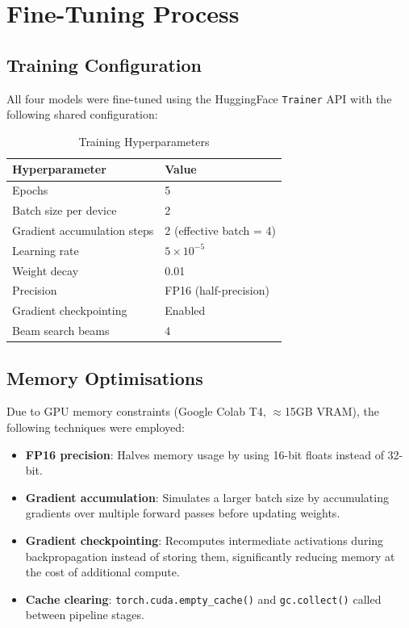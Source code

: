 \documentclass[12pt, a4paper]{report}
\begin{document}
\section{Fine-Tuning Process}

\subsection{Training Configuration}

All four models were fine-tuned using the HuggingFace \texttt{Trainer} API with the following shared configuration:

\begin{table}[H]
\centering
\caption{Training Hyperparameters}
\begin{tabular}{ll}
\toprule
\textbf{Hyperparameter} & \textbf{Value} \\
\midrule
Epochs & 5 \\
Batch size per device & 2 \\
Gradient accumulation steps & 2 (effective batch = 4) \\
Learning rate & $5 \times 10^{-5}$ \\
Weight decay & 0.01 \\
Precision & FP16 (half-precision) \\
Gradient checkpointing & Enabled \\
Beam search beams & 4 \\
\bottomrule
\end{tabular}
\end{table}

\subsection{Memory Optimisations}
Due to GPU memory constraints (Google Colab T4, $\approx$15GB VRAM), the following techniques were employed:
\begin{itemize}
    \item \textbf{FP16 precision}: Halves memory usage by using 16-bit floats instead of 32-bit.
    \item \textbf{Gradient accumulation}: Simulates a larger batch size by accumulating gradients over multiple forward passes before updating weights.
    \item \textbf{Gradient checkpointing}: Recomputes intermediate activations during backpropagation instead of storing them, significantly reducing memory at the cost of additional compute.
    \item \textbf{Cache clearing}: \texttt{torch.cuda.empty\_cache()} and \texttt{gc.collect()} called between pipeline stages.
\end{itemize}
\end{document}
